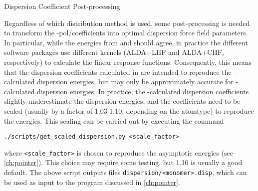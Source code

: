 \begin{subsubsection}{Dispersion Coefficient Post-processing}
\label{sec:workflow-cn_postprocess}

Regardless of which distribution method is used, some post-processing is
needed to transform the \isa-pol/\idma coefficients into optimal dispersion
force field parameters. In particular, while the \dftsapt energies from
\molpro and \camcasp should agree, in practice the different software packages
use different kernels (ALDA+LHF and ALDA+CHF, respectively) to calculate the
linear response functions. Consequently, this means that the dispersion
coefficients calculated in \camcasp are intended to reproduce the \camcasp-calculated
\dftsapt dispersion energies, but may only be approximately accurate for
\molpro-calculated \dftsapt dispersion energies.\footnotemark{ } In practice, the
\camcasp-calculated dispersion coefficients slightly underestimate the \molpro
dispersion energies, and the coefficients need to be scaled (usually by a factor of 1.03-1.10,
depending on the atomtype) to reproduce the \molpro energies. This scaling can
be carried out by executing the command
%
\begin{lstlisting}
./scripts/get_scaled_dispersion.py <scale_factor>
\end{lstlisting}
%
where \verb|<scale_factor>| is chosen to reproduce the asymptotic \molpro
\dftsapt energies (see \cref{ch:pointer}). This choice may require some
testing, but 1.10 is usually a good default. The above script outputs files
\verb|dispersion/<monomer>.disp|, which can be used as input to the \pointer
program discussed in \cref{ch:pointer}.


\end{subsubsection}
